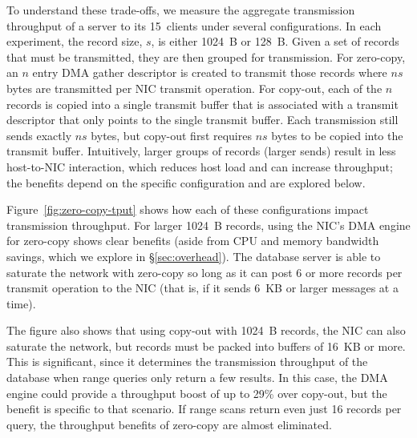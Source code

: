 To understand these trade-offs, we measure the aggregate transmission
throughput of a server to its 15~clients under several
configurations.  In each experiment, the record size, $s$, is either 1024~B or
128~B. Given a set of records that must be transmitted, they are then grouped
for transmission. For zero-copy, an $n$ entry DMA gather descriptor is created
to transmit those records where $ns$ bytes are transmitted per NIC transmit
operation. For copy-out, each of the $n$ records is copied into a single
transmit buffer that is associated with a transmit descriptor that only points
to the single transmit buffer. Each transmission still sends exactly $ns$
bytes, but copy-out first requires $ns$ bytes to be copied into the transmit buffer.
Intuitively, larger groups of records (larger sends) result in less host-to-NIC
interaction, which reduces host load and can increase throughput; the benefits
depend on the specific configuration and are explored below.


Figure~\ref{fig:zero-copy-tput} shows how each of these configurations impact
transmission throughput. For larger 1024~B records, using the NIC's DMA engine
for zero-copy shows clear benefits (aside from CPU and memory bandwidth
savings, which we explore in \S\ref{sec:overhead}). The database server is able
to saturate the network with zero-copy so long as it can post 6 or more
records per transmit operation to the NIC (that is, if it sends 6~KB or larger
messages at a time).

The figure also shows that using copy-out with 1024~B records, the NIC can also
saturate the network, but records must be packed into buffers of 16~KB or more.
This is significant, since it determines the transmission
throughput of the database when range queries only return a few
results. In this case, the DMA engine could provide a throughput boost
of up to 29\% over copy-out, but the benefit is specific to
that scenario. If range scans return even just 16 records per query, the
throughput benefits of zero-copy are almost eliminated.



